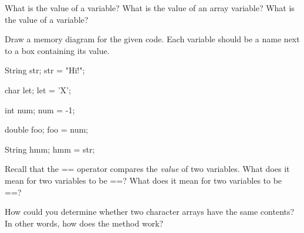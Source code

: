 \begin{answer}
\end{answer}


\Q What is the value of a  variable?
What is the value of an array variable?
What is the value of a  variable?

\begin{answer}
\end{answer}


\Q Draw a memory diagram for the given code.
Each variable should be a name next to a box containing its value.

\vspace{1ex}
\begin{javalst}
String str;
str = "Hi!";

char let;
let = 'X';

int num;
num = -1;

double foo;
foo = num;

String hmm;
hmm = str;
\end{javalst}


\Q Recall that the == operator compares the \emph{value} of two variables.
What does it mean for two  variables to be ==?
What does it mean for two  variables to be ==?

\begin{answer}
\end{answer}


\Q How could you determine whether two character arrays have the same contents?
In other words, how does the  method work?

\begin{answer}
\end{answer}
